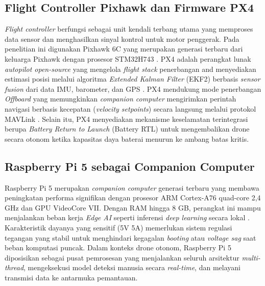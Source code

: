 \subsection{Flight Controller Pixhawk dan Firmware PX4}
\textit{Flight controller} berfungsi sebagai unit kendali terbang utama yang memproses data sensor dan menghasilkan sinyal kontrol untuk motor penggerak. Pada penelitian ini digunakan Pixhawk 6C yang merupakan generasi terbaru dari keluarga Pixhawk dengan prosesor STM32H743 \cite{Pixhawk6C2024}. PX4 adalah perangkat lunak \textit{autopilot open-source} yang mengelola \textit{flight stack} penerbangan and menyediakan estimasi posisi melalui algoritma \textit{Extended Kalman Filter} (EKF2) berbasis \textit{sensor fusion} dari data IMU, barometer, dan GPS \cite{Meier2015PX4, Faragher2012EKF}. PX4 mendukung mode penerbangan \textit{Offboard} yang memungkinkan \textit{companion computer} mengirimkan perintah navigasi berbasis kecepatan (\textit{velocity setpoints}) secara langsung melalui protokol MAVLink \cite{PX4DevGuide2024}. Selain itu, PX4 menyediakan mekanisme keselamatan terintegrasi berupa \textit{Battery Return to Launch} (Battery RTL) untuk mengembalikan drone secara otonom ketika kapasitas daya baterai menurun ke ambang batas kritis.

\subsection{Raspberry Pi 5 sebagai Companion Computer}
Raspberry Pi 5 merupakan \textit{companion computer} generasi terbaru yang membawa peningkatan performa signifikan dengan prosesor ARM Cortex-A76 quad-core 2,4 GHz dan GPU VideoCore VII. Dengan RAM hingga 8 GB, perangkat ini mampu menjalankan beban kerja \textit{Edge AI} seperti inferensi \textit{deep learning} secara lokal \cite{RaspberryPi2024}. Karakteristik dayanya yang sensitif (5V 5A) memerlukan sistem regulasi tegangan yang stabil untuk menghindari kegagalan \textit{booting} atau \textit{voltage sag} saat beban komputasi puncak. Dalam konteks drone otonom, Raspberry Pi 5 diposisikan sebagai pusat pemrosesan yang menjalankan seluruh arsitektur \textit{multi-thread}, mengeksekusi model deteksi manusia secara \textit{real-time}, dan melayani transmisi data ke antarmuka pemantauan.

